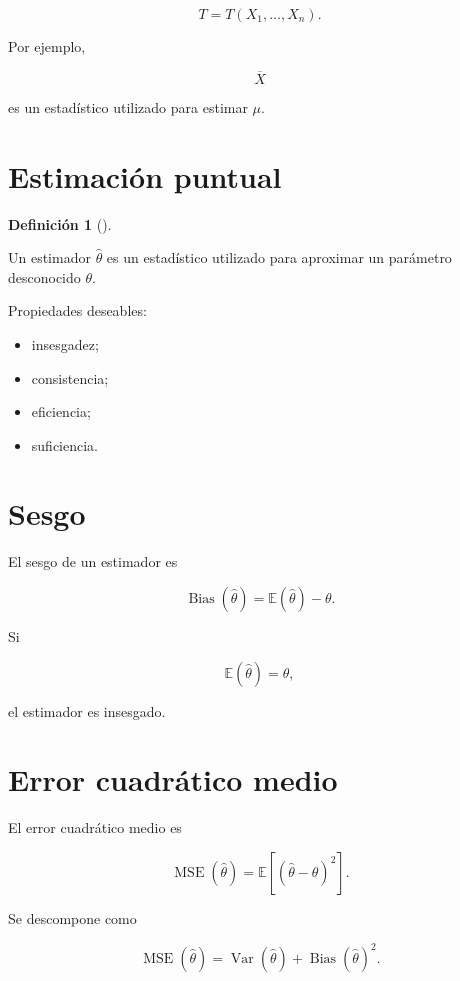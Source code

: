 \documentclass[
  spanish,
  11pt,
  letterpaper,
  DIV=11,
  numbers=noendperiod]{scrreprt}
\providecommand{\tightlist}{%
  \setlength{\itemsep}{0pt}\setlength{\parskip}{0pt}}
\theoremstyle{definition}
\newtheorem{definition}{Definición}[chapter]
\theoremstyle{plain}
\theoremstyle{definition}
\theoremstyle{remark}
\begin{document}
\[
T=T(X_1,\ldots,X_n).
\]

Por ejemplo,

\[
\overline{X}
\]

es un estadístico utilizado para estimar \(\mu\).

\section{Estimación puntual}\label{estimaciuxf3n-puntual}

\begin{definition}[]\protect\hypertarget{def-estimador}{}\label{def-estimador}

Un estimador \(\widehat{\theta}\) es un estadístico utilizado para
aproximar un parámetro desconocido \(\theta\).

\end{definition}

Propiedades deseables:

\begin{itemize}
\tightlist
\item
  insesgadez;
\item
  consistencia;
\item
  eficiencia;
\item
  suficiencia.
\end{itemize}

\section{Sesgo}\label{sesgo}

El sesgo de un estimador es

\[
\operatorname{Bias}(\widehat{\theta})
=
\mathbb{E}(\widehat{\theta})-\theta.
\]

Si

\[
\mathbb{E}(\widehat{\theta})=\theta,
\]

el estimador es insesgado.

\section{Error cuadrático medio}\label{error-cuadruxe1tico-medio}

El error cuadrático medio es

\[
\operatorname{MSE}(\widehat{\theta})
=
\mathbb{E}
\left[
(\widehat{\theta}-\theta)^2
\right].
\]

Se descompone como

\[
\operatorname{MSE}(\widehat{\theta})
=
\operatorname{Var}(\widehat{\theta})
+
\operatorname{Bias}(\widehat{\theta})^2.
\]
\end{document}
